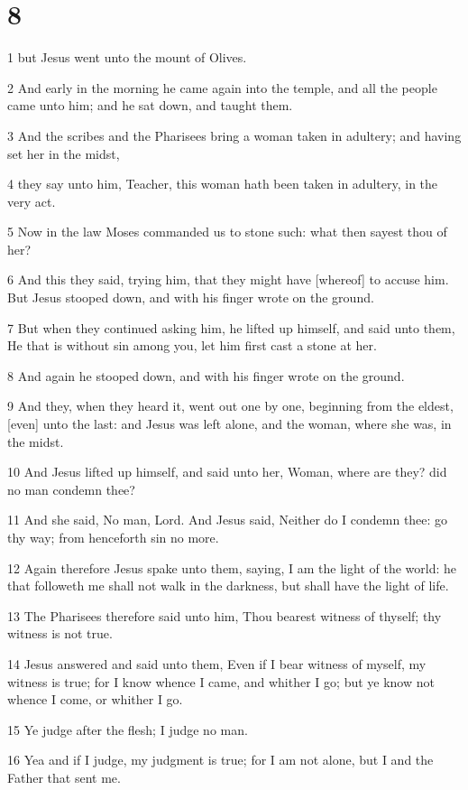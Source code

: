 \chapter{8}

\par 1 but Jesus went unto the mount of Olives.
\par 2 And early in the morning he came again into the temple, and all the people came unto him; and he sat down, and taught them.
\par 3 And the scribes and the Pharisees bring a woman taken in adultery; and having set her in the midst,
\par 4 they say unto him, Teacher, this woman hath been taken in adultery, in the very act.
\par 5 Now in the law Moses commanded us to stone such: what then sayest thou of her?
\par 6 And this they said, trying him, that they might have [whereof] to accuse him. But Jesus stooped down, and with his finger wrote on the ground.
\par 7 But when they continued asking him, he lifted up himself, and said unto them, He that is without sin among you, let him first cast a stone at her.
\par 8 And again he stooped down, and with his finger wrote on the ground.
\par 9 And they, when they heard it, went out one by one, beginning from the eldest, [even] unto the last: and Jesus was left alone, and the woman, where she was, in the midst.
\par 10 And Jesus lifted up himself, and said unto her, Woman, where are they? did no man condemn thee?
\par 11 And she said, No man, Lord. And Jesus said, Neither do I condemn thee: go thy way; from henceforth sin no more.
\par 12 Again therefore Jesus spake unto them, saying, I am the light of the world: he that followeth me shall not walk in the darkness, but shall have the light of life.
\par 13 The Pharisees therefore said unto him, Thou bearest witness of thyself; thy witness is not true.
\par 14 Jesus answered and said unto them, Even if I bear witness of myself, my witness is true; for I know whence I came, and whither I go; but ye know not whence I come, or whither I go.
\par 15 Ye judge after the flesh; I judge no man.
\par 16 Yea and if I judge, my judgment is true; for I am not alone, but I and the Father that sent me.
